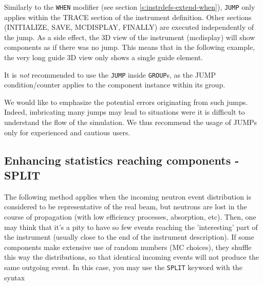 Similarly to the \texttt{WHEN} modifier (see section
\ref{s:instrdefs-extend-when}), \texttt{JUMP} only applies within the TRACE
section of the instrument definition. Other sections (INITIALIZE, SAVE,
MCDISPLAY, FINALLY) are executed independently of the jump. As a side effect,
the 3D view of the instrument (mcdisplay) will show components as if there was
no jump. This means that in the following example, the very long guide 3D view
only shows a single guide element.

It is \emph{not} recommended to use the \verb+JUMP+ inside \verb+GROUP+s, as the
JUMP condition/counter applies to the component instance within its group.

We would like to emphasize the potential errors originating from such
jumps. Indeed, imbricating many jumps may lead to situations were it is
difficult to understand the flow of the simulation. We thus recommend the usage
of JUMPs only for experienced and cautious users.

\subsection{Enhancing statistics reaching components - SPLIT}
\label{s:instrdefs-extend-enhance}

The following method applies when the incoming neutron event distribution is
considered to be representative of the real beam, but neutrons are lost in the
course of propagation (with low efficiency processes, absorption, etc). Then,
one may think that it's a pity to have so few events reaching the 'interesting'
part of the instrument (usually close to the end of the instrument description).
If some components make extensive use of random numbers (MC choices), they
shuffle this way the distributions, so that identical incoming events will not
produce the same outgoing event. In this case, you may use the \verb+SPLIT+
keyword with the syntax


